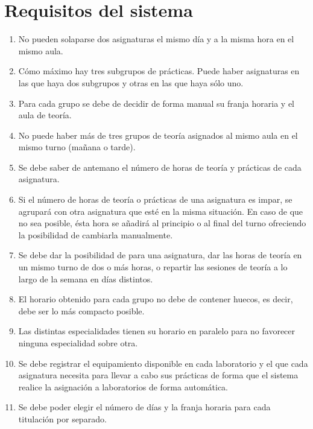 \section{Requisitos del sistema}

\begin{enumerate}[REQ-1]
    \item No pueden solaparse dos asignaturas el mismo día y a la misma hora en el mismo aula.
    \item Cómo máximo hay tres subgrupos de prácticas. Puede haber asignaturas en las que haya dos subgrupos y otras en las que haya sólo uno.
    \item Para cada grupo se debe de decidir de forma manual su franja horaria y el aula de teoría.
    \item No puede haber más de tres grupos de teoría asignados al mismo aula en el mismo turno (mañana o tarde). 
    \item Se debe saber de antemano el número de horas de teoría y prácticas de cada asignatura.
    \item Si el número de horas de teoría o prácticas de una asignatura es impar, se agrupará con otra asignatura que esté en la misma situación. En caso de que no sea posible, ésta hora se añadirá al principio o al final del turno ofreciendo la posibilidad de cambiarla manualmente.
    \item Se debe dar la posibilidad de para una asignatura, dar las horas de teoría en un mismo turno de dos o más horas, o repartir las sesiones de teoría a lo largo de la semana en días distintos.
    \item El horario obtenido para cada grupo no debe de contener huecos, es decir, debe ser lo más compacto posible.
    \item Las distintas especialidades tienen su horario en paralelo para no favorecer ninguna especialidad sobre otra.
    \item Se debe registrar el equipamiento disponible en cada laboratorio y el que cada asignatura necesita para llevar a cabo sus prácticas de forma que el sistema realice la asignación a laboratorios de forma automática.
    \item Se debe poder elegir el número de días y la franja horaria para cada titulación por separado. 
\end{enumerate}
